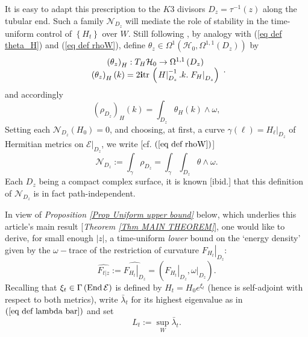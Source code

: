 \documentclass{article}
\newcommand{\func}[1]{\textnormal {#1\,}}
\begin{document}
It is easy to adapt this prescription to the $K3$ divisors $D_{z}=\tau ^{-1}\left(
z\right) $ along the tubular end. 
Such a family $\mathcal{N}_{D_{z}}$ will mediate the role of stability in the time-uniform control of $%
\left\{ H_{t}\right\} $ over $W$.
Still following \cite[pp.8-11]{ASDYM}, by analogy with (\ref{eq def theta_H}) and (\ref{eq def rhoW}), define $\theta_{z} \in \Omega ^{1}\left( \mathcal{H}_{0},\Omega ^{1,1}\left( D_{z}\right) \right) $  by 
\begin{equation}
\begin{array}{c}        \label{eq def (theta_z)_H}
\left(\theta_{z}\right) _{H}:T_{H}\mathcal{H}_{0}\rightarrow \Omega ^{1,1}\left( D_{z}\right) \\ 
\left(\theta_{z}\right) _{H}\left( k\right) =2\mathbf{i}\func{tr}
\left(\left.H\right\vert _{D_{z}}^{-1}.k.
\left.F_{H}\right\vert _{D_{z}}\right)%
\end{array}.  
\end{equation}%
and accordingly 
\begin{equation}        \label{eq def rhoD_z}
        \left( \rho _{D_z}\right) _{H}\left( k\right) 
        =\int_{D_{z}}\theta _{H}\left(k\right) \wedge \omega,
\end{equation}%
Setting each $\mathcal{N}_{D_{z}}\left( H_{0}\right) =0$, and choosing, at first, a curve   $\gamma
\left( \ell \right) =\left. H_{\ell }\right\vert _{D_{z}}$ of
Hermitian metrics on $\left. \mathcal{E}\right\vert _{D_{z}}$, we write [cf. $%
\left( \ref{eq def rhoW}\right)$]%
\begin{equation}
\mathcal{N}_{D_{z}}:= \int_{\gamma }\rho _{D_{z}}=\int_{\gamma
}\int_{D_{z}}\theta \wedge \omega.   \label{eq def NDz and NE}
\end{equation}%
Each $D_{z}$
being a compact complex surface, it is known  [ibid.] that this definition of $\mathcal{N}%
_{D_{z}}$ is in fact path-independent. 

In view of \emph{Proposition \ref{Prop Uniform upper bound}} below, which underlies this article's main result [\emph{Theorem \ref{Thm MAIN THEOREM}}], one would like to
derive, for  small enough $\left\vert z\right\vert $, a time-uniform \emph{lower} bound on the `energy density' given by the $\omega-$trace of the restriction of curvature  $\left.F_{H_t}\right\vert _{D_{z}}$:
\begin{displaymath}
\widehat{F_{t\vert z}} := \widehat{\left.F_{H_t}\right\vert_{D_z}} = \left( \left.F_{H_t}\right\vert_{D_z} , \left.\omega \right\vert_{D_z}\right).
\end{displaymath}
Recalling that $\xi _{t}\in \Gamma \left( 
\func{End} \mathcal{E} \right) $ is defined by $H_{t}=H_{0}e^{\xi _{t}}$ (hence is self-adjoint with respect to both metrics), write $\bar{\lambda}_{t}$ for its highest eigenvalue as in $\left( \ref{eq def lambda bar}\right)$ and set 
\begin{displaymath}
        L_{t}:=\sup_{W}\bar{\lambda}_{t}.
\end{displaymath}
\end{document}
